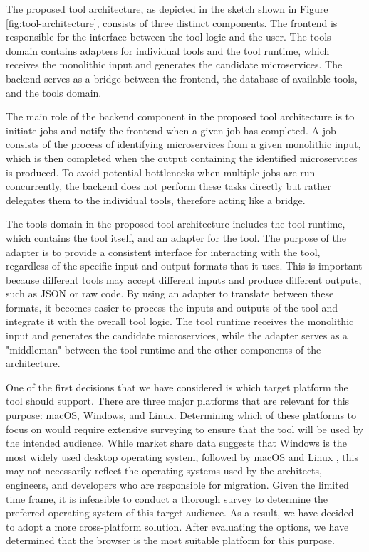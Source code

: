 \documentclass[conference]{IEEEtran}
\begin{document}
The proposed tool architecture, as depicted in the sketch shown in Figure
\ref{fig:tool-architecture}, consists of three distinct components. The
frontend is responsible for the interface between the tool logic and the user.
The tools domain contains adapters for individual tools and the tool runtime,
which receives the monolithic input and generates the candidate microservices.
The backend serves as a bridge between the frontend, the database of available
tools, and the tools domain.

The main role of the backend component in the proposed tool architecture is to
initiate jobs and notify the frontend when a given job has completed. A job
consists of the process of identifying microservices from a given monolithic
input, which is then completed when the output containing the identified
microservices is produced. To avoid potential bottlenecks when multiple jobs
are run concurrently, the backend does not perform these tasks directly but
rather delegates them to the individual tools, therefore acting like a bridge.

The tools domain in the proposed tool architecture includes the tool runtime,
which contains the tool itself, and an adapter for the tool. The purpose of the
adapter is to provide a consistent interface for interacting with the tool,
regardless of the specific input and output formats that it uses. This is
important because different tools may accept different inputs and produce
different outputs, such as JSON or raw code. By using an adapter to translate
between these formats, it becomes easier to process the inputs and outputs of
the tool and integrate it with the overall tool logic. The tool runtime
receives the monolithic input and generates the candidate microservices, while
the adapter serves as a "middleman" between the tool runtime and the other
components of the architecture.

One of the first decisions that we have considered is which target platform the
tool should support. There are three major platforms that are relevant for this
purpose: macOS, Windows, and Linux. Determining which of these platforms to
focus on would require extensive surveying to ensure that the tool will be used
by the intended audience. While market share data suggests that Windows is the
most widely used desktop operating system, followed by macOS and Linux
\cite{desktop-usage-worldwide}, this may not necessarily reflect the operating
systems used by the architects, engineers, and developers who are responsible
for migration. Given the limited time frame, it is infeasible to conduct a
thorough survey to determine the preferred operating system of this target
audience. As a result, we have decided to adopt a more cross-platform solution.
After evaluating the options, we have determined that the browser is the most
suitable platform for this purpose.
\end{document}
